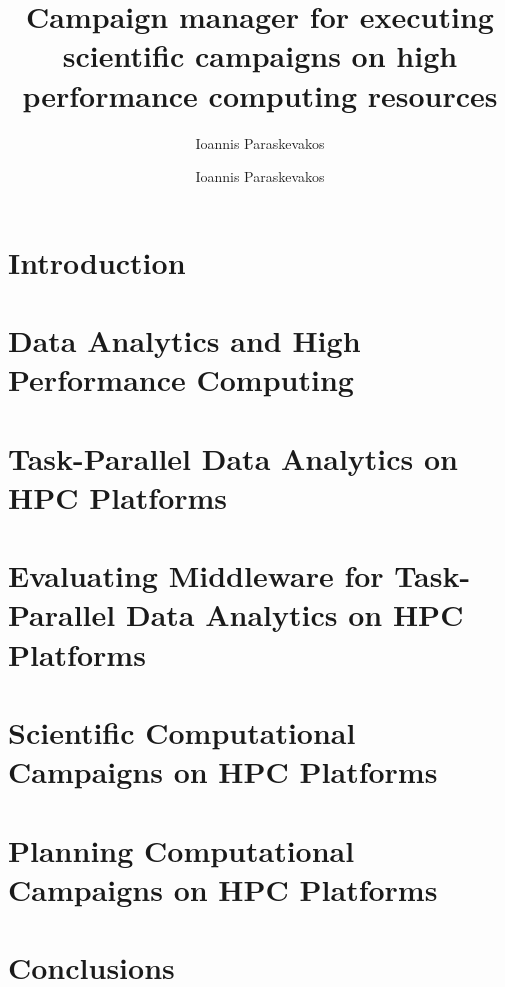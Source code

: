 \documentclass[final]{ruthesis}
\begin{document}
\author{Ioannis Paraskevakos}
\copyrightp
\title{Campaign manager for executing scientific campaigns on high performance computing resources}
\author{Ioannis Paraskevakos}
\figurespage
\tablespage

\abstract{}
\acknowledgements{}

\beforepreface
\afterpreface

\chapter{Introduction}


\chapter{Data Analytics and High Performance Computing}


\chapter{Task-Parallel Data Analytics on HPC Platforms}


\chapter{Evaluating Middleware for Task-Parallel Data Analytics on HPC Platforms}


\chapter{Scientific Computational Campaigns on HPC Platforms}

\chapter{Planning Computational Campaigns on HPC Platforms}

\chapter{Conclusions}




\end{document}
